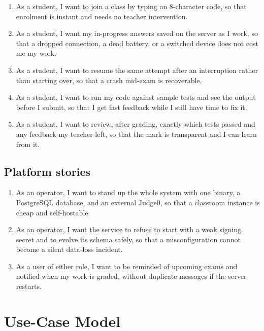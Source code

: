 \begin{enumerate}[label=\textbf{ST-S\arabic*},leftmargin=3.2em]
  \item As a student, I want to join a class by typing an 8-character code, so that
        enrolment is instant and needs no teacher intervention.
  \item As a student, I want my in-progress answers saved on the server as I work, so
        that a dropped connection, a dead battery, or a switched device does not cost me
        my work.
  \item As a student, I want to resume the same attempt after an interruption rather
        than starting over, so that a crash mid-exam is recoverable.
  \item As a student, I want to run my code against sample tests and see the output
        before I submit, so that I get fast feedback while I still have time to fix it.
  \item As a student, I want to review, after grading, exactly which tests passed and
        any feedback my teacher left, so that the mark is transparent and I can learn
        from it.
\end{enumerate}

\subsection*{Platform stories}

\begin{enumerate}[label=\textbf{ST-P\arabic*},leftmargin=3.2em]
  \item As an operator, I want to stand up the whole system with one binary, a
        PostgreSQL database, and an external Judge0, so that a classroom instance is
        cheap and self-hostable.
  \item As an operator, I want the service to refuse to start with a weak signing
        secret and to evolve its schema safely, so that a misconfiguration cannot become
        a silent data-loss incident.
  \item As a user of either role, I want to be reminded of upcoming exams and notified
        when my work is graded, without duplicate messages if the server restarts.
\end{enumerate}

\section{Use-Case Model}
\label{sec:req-usecase}

